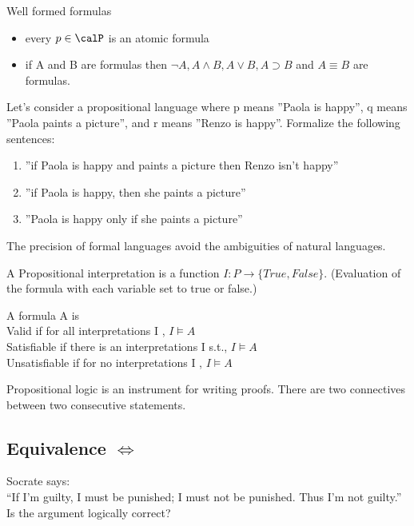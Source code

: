 \begin{definition}{Well formed formulas}
  \begin{itemize}
    \item every $p \in \calP$ is an atomic formula
    \item if A and B are formulas then $\neg A, A  \land B, A \lor B, A \supset B$ and $A \equiv B$ are formulas.
  \end{itemize}
\end{definition}

\begin{example}
Let’s consider a propositional language where p means ”Paola is happy”, q means
”Paola paints a picture”, and r means ”Renzo is happy”.
Formalize the following sentences:
\begin{enumerate}
  \item ”if Paola is happy and paints a picture then Renzo isn’t happy”
  \item ”if Paola is happy, then she paints a picture”
\item ”Paola is happy only if she paints a picture”
\end{enumerate}
The precision of formal languages avoid the ambiguities of natural
languages.
\end{example}

\begin{definition}
A Propositional interpretation is a function $I : P \to \{True,False\}$. (Evaluation of the formula with each variable set to true or false.)
\end{definition}

\begin{definition}
A formula A is\\
Valid if for all interpretations I , $I  \models  A$\\
Satisfiable if there is an interpretations I s.t., $I\models A$\\
Unsatisfiable if for no interpretations I , $I \models A$\\
\end{definition}

Propositional logic is an instrument for writing proofs. There are two connectives between two consecutive statements.
\subsection{Equivalence $\iff$}



\begin{example}
  Socrate says:\\
“If I’m guilty, I must be punished;
I must not be punished. Thus I’m not guilty.”\\
Is the argument logically correct?
\end{example}
\vspace{2in}

